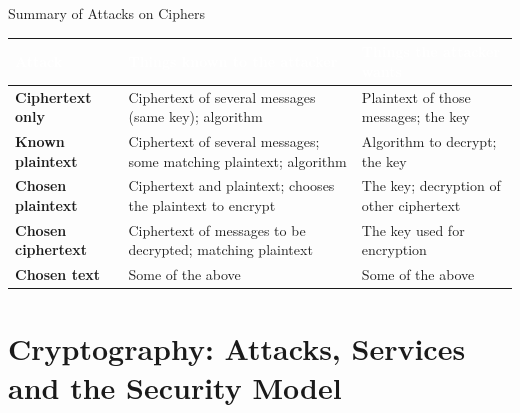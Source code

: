 \documentclass[aspectratio=169,11pt,xcolor={table}]{beamer}
\begin{document}
\begin{frame}{Summary of Attacks on Ciphers}
  \centering
  \scriptsize
  \renewcommand{\arraystretch}{1.3}
  \begin{tabular}{>{\bfseries}p{2.3cm} p{5.4cm} p{4.3cm}}
    \toprule
    \rowcolor{navy}\textcolor{white}{Attack} & \textcolor{white}{\textbf{Things known to the attacker}} & \textcolor{white}{\textbf{Things the attacker wants}}\\
    \midrule
    \rowcolor{leaf!8}\textcolor{leaf!70!black}{Ciphertext only} & Ciphertext of several messages (same key); algorithm & Plaintext of those messages; the key\\
    \rowcolor{aqua!8}\textcolor{aqua!70!black}{Known plaintext} & Ciphertext of several messages; some matching plaintext; algorithm & Algorithm to decrypt; the key\\
    \rowcolor{ocean!8}\textcolor{ocean}{Chosen plaintext} & Ciphertext and plaintext; chooses the plaintext to encrypt & The key; decryption of other ciphertext\\
    \rowcolor{grape!8}\textcolor{grape}{Chosen ciphertext} & Ciphertext of messages to be decrypted; matching plaintext & The key used for encryption\\
    \rowcolor{brick!8}\textcolor{brick}{Chosen text} & Some of the above & Some of the above\\
    \bottomrule
  \end{tabular}
  \vspace{4mm}

\end{frame}

\setcounter{section}{8}
\section{Cryptography: Attacks, Services and the Security Model}
\end{document}
